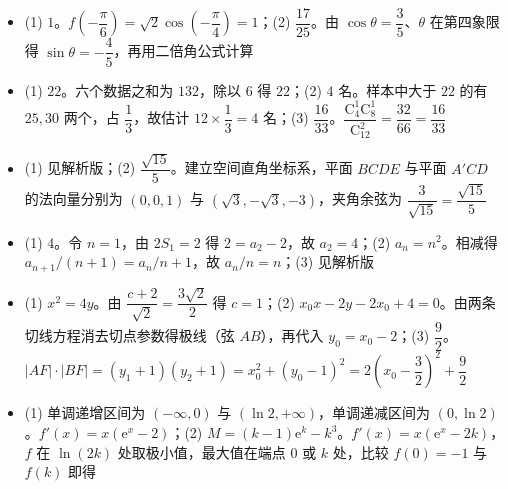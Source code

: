 \begin{itemize}[leftmargin=2.6em]
  \item[\textbf{16.}] (1) $1$。$f\left(-\dfrac{\pi}{6}\right)=\sqrt2\cos\left(-\dfrac{\pi}{4}\right)=1$；(2) $\dfrac{17}{25}$。由 $\cos\theta=\dfrac35$、$\theta$ 在第四象限得 $\sin\theta=-\dfrac45$，再用二倍角公式计算
  \item[\textbf{17.}] (1) $22$。六个数据之和为 $132$，除以 $6$ 得 $22$；(2) $4$ 名。样本中大于 $22$ 的有 $25,30$ 两个，占 $\dfrac13$，故估计 $12\times\dfrac13=4$ 名；(3) $\dfrac{16}{33}$。$\dfrac{\mathrm C_4^1\mathrm C_8^1}{\mathrm C_{12}^2}=\dfrac{32}{66}=\dfrac{16}{33}$
  \item[\textbf{18.}] (1) 见解析版；(2) $\dfrac{\sqrt{15}}5$。建立空间直角坐标系，平面 $BCDE$ 与平面 $A'CD$ 的法向量分别为 $(0,0,1)$ 与 $(\sqrt3,-\sqrt3,-3)$，夹角余弦为 $\dfrac{3}{\sqrt{15}}=\dfrac{\sqrt{15}}5$
  \item[\textbf{19.}] (1) $4$。令 $n=1$，由 $2S_1=2$ 得 $2=a_2-2$，故 $a_2=4$；(2) $a_n=n^2$。相减得 $a_{n+1}/(n+1)=a_n/n+1$，故 $a_n/n=n$；(3) 见解析版
  \item[\textbf{20.}] (1) $x^2=4y$。由 $\dfrac{c+2}{\sqrt2}=\dfrac{3\sqrt2}{2}$ 得 $c=1$；(2) $x_0x-2y-2x_0+4=0$。由两条切线方程消去切点参数得极线（弦 $AB$），再代入 $y_0=x_0-2$；(3) $\dfrac92$。$|AF|\cdot|BF|=(y_1+1)(y_2+1)=x_0^2+(y_0-1)^2=2\left(x_0-\dfrac32\right)^2+\dfrac92$
  \item[\textbf{21.}] (1) 单调递增区间为 $(-\infty,0)$ 与 $(\ln2,+\infty)$，单调递减区间为 $(0,\ln2)$。$f'(x)=x(\mathrm e^x-2)$；(2) $M=(k-1)\mathrm e^k-k^3$。$f'(x)=x(\mathrm e^x-2k)$，$f$ 在 $\ln(2k)$ 处取极小值，最大值在端点 $0$ 或 $k$ 处，比较 $f(0)=-1$ 与 $f(k)$ 即得
\end{itemize}
